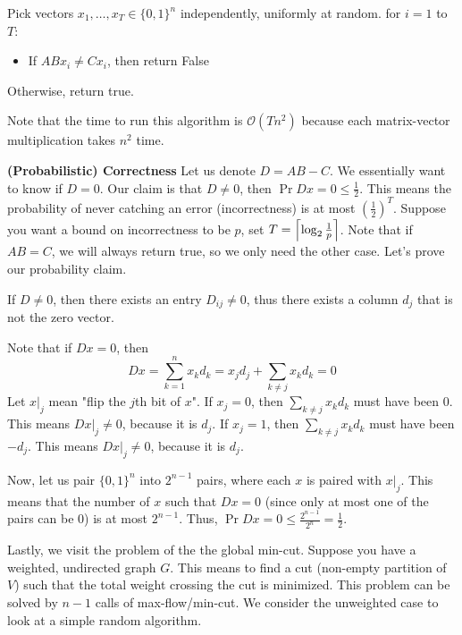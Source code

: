 \begin{algothm}
    Pick vectors $x_1, \dots, x_T \in \{0, 1\}^n$ independently, uniformly at random.
    for $i = 1$ to $T$:
    \begin{itemize}
        \item If $AB x_i \neq C x_i$, then return False
    \end{itemize}
    Otherwise, return true.

    Note that the time to run this algorithm is $\mathcal{O}(Tn^2)$ because each matrix-vector multiplication takes $n^2$ time.

    \textbf{(Probabilistic) Correctness}
    Let us denote $D = AB - C$. We essentially want to know if $D = 0$. Our claim is that $D \neq 0$, then $\Pr{Dx = 0} \leq \frac12$. This means the probability of never catching an error (incorrectness)
    is at most $(\frac12)^T$. Suppose you want a bound on incorrectness to be $p$, set $T = \left\lceil \log_2 \frac{1}{p} \right\rceil$. Note that if $AB = C$, we will always return true, so we only need the other case.
    Let's prove our probability claim.

    If $D \neq 0$, then there exists an entry $D_{ij} \neq 0$, thus there exists a column $d_j$ that is not the zero vector.
   
    Note that if $Dx = 0$, then
    \[ Dx = \sum_{k = 1}^n x_k d_k = x_j d_j + \sum_{k \neq j} x_k d_k = 0 \]
    Let $x\Bigr|_{j}$ mean "flip the $j$th bit of $x$".
    If $x_j = 0$, then $\sum_{k \neq j} x_k d_k$ must have been 0. This means $Dx \Bigr|_{j} \neq 0$, because it is $d_j$. 
    If $x_j = 1$, then $\sum_{k \neq j} x_k d_k$ must have been $-d_j$. This means $Dx \Bigr|_{j} \neq 0$, because it is $d_j$.

    Now, let us pair $\{0, 1\}^n$ into $2^{n - 1}$ pairs, where each $x$ is paired with $x \Bigr|_{j}$. This means that the number of $x$ such that $Dx = 0$ (since only at most one of the pairs can be 0)
    is at most $2^{n - 1}$. Thus, $\Pr{Dx = 0} \leq \frac{2^{n - 1}}{2^n} = \frac12$.
\end{algothm}

Lastly, we visit the problem of the the global min-cut. Suppose you have a weighted, undirected graph $G$. This means to find a cut (non-empty partition of $V$) such that the total weight crossing the cut is minimized.
This problem can be solved by $n - 1$ calls of max-flow/min-cut. We consider the unweighted case to look at a simple random algorithm.

